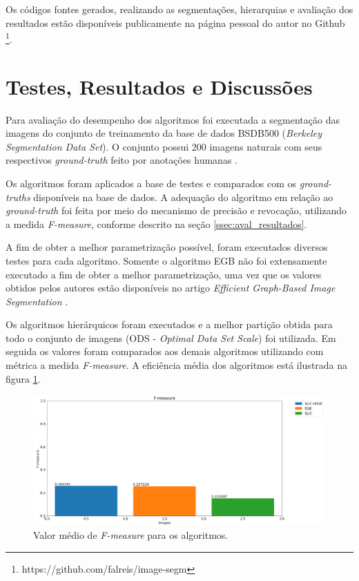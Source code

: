 \begin{document}
Os códigos fontes gerados, realizando as segmentações, hierarquias e avaliação dos resultados estão disponíveis publicamente na página pessoal do autor no Github \footnote{https://github.com/falreis/image-segm}.




\section{Testes, Resultados e Discussões} \label{sec:testes}

Para avaliação do desempenho dos algoritmos foi executada a segmentação das imagens do conjunto de treinamento da base de dados  BSDB500 (\textit{Berkeley Segmentation Data Set}). O conjunto possui 200 imagens naturais com seus respectivos \textit{ground-truth} feito por anotações humanas \cite{BSDS500}. 

Os algoritmos foram aplicados a base de testes e comparados com os \textit{ground-truths} disponíveis na base de dados. A adequação do algoritmo em relação ao \textit{ground-truth} foi feita por meio do mecanismo de precisão e revocação, utilizando a medida \textit{F-measure}, conforme descrito na seção \ref{ssec:aval_resultados}.

A  fim de obter a melhor parametrização possível, foram executados diversos testes para cada algoritmo. Somente o algoritmo EGB não foi extensamente executado a fim de obter a melhor parametrização, uma vez que os valores obtidos pelos autores estão disponíveis no artigo \textit{Efficient Graph-Based Image Segmentation} \cite{FELZENSZWALB}. 

Os algoritmos hierárquicos foram executados e a melhor partição obtida para todo o conjunto de imagens (ODS - \textit{Optimal Data Set Scale}) \cite{CONT_EMPIRICAL} foi utilizada. Em seguida os valores foram comparados aos demais algoritmos utilizando com métrica a medida \textit{F-measure}. A eficiência média dos algoritmos está ilustrada na figura \ref{fig:FMEASURE_AVG}.

\begin{figure}[ht]
\centering
\includegraphics[width=1.\textwidth]{fmeasure_avg.png}
\caption{Valor médio de \textit{F-measure} para os algoritmos.}
\label{fig:FMEASURE_AVG}
\end{figure}
\end{document}

